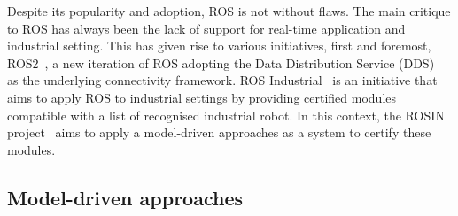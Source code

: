Despite its popularity and adoption, ROS is not without flaws. The main critique to ROS has always been the lack of support for real-time application and industrial setting. This has given rise to various initiatives, first and foremost, ROS2~\cite{ros2}, a new iteration of ROS adopting the Data Distribution Service (DDS)~\cite{pardo2003omg} as the underlying connectivity framework. ROS Industrial~\cite{edwards2012ros} is an initiative that aims to apply ROS to industrial settings by providing certified modules compatible with a list of recognised industrial robot. In this context, the ROSIN project~\cite{rosin} aims to apply a model-driven approaches as a system to certify these modules.

\subsection{Model-driven approaches}

